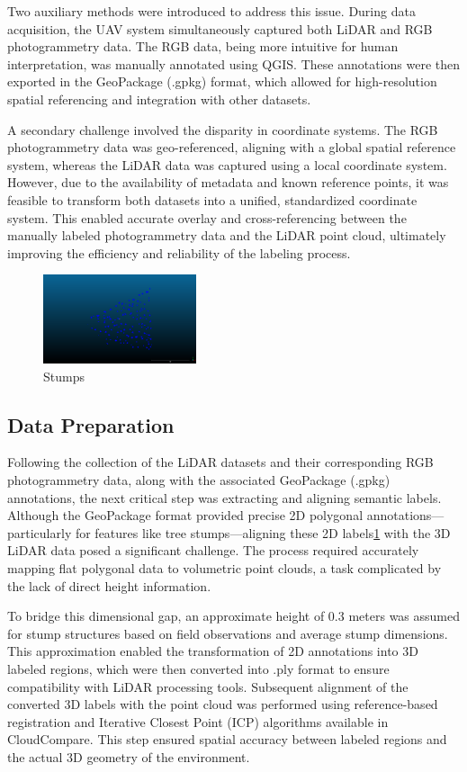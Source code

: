 \documentclass[../report.tex]{subfiles}
\begin{document}
    Two auxiliary methods were introduced to address this issue. During data acquisition, the UAV system simultaneously captured both LiDAR and RGB photogrammetry data. The RGB data, being more intuitive for human interpretation, was manually annotated using QGIS. These annotations were then exported in the GeoPackage\cite{gdal2025gpkg} (.gpkg) format, which allowed for high-resolution spatial referencing and integration with other datasets.
    
    A secondary challenge involved the disparity in coordinate systems. The RGB photogrammetry data was geo-referenced, aligning with a global spatial reference system, whereas the LiDAR data was captured using a local coordinate system. However, due to the availability of metadata and known reference points, it was feasible to transform both datasets into a unified, standardized coordinate system. This enabled accurate overlay and cross-referencing between the manually labeled photogrammetry data and the LiDAR point cloud, ultimately improving the efficiency and reliability of the labeling process.
    \begin{figure}[H]
        \centering
        \includegraphics[width=0.4\textwidth]{rnd-project-report-main/figures/Stumps_matched.png}
        \caption{Stumps}
        \label{fig:stumps}
    \end{figure}
    
    
	\subsection{Data Preparation}
    Following the collection of the LiDAR datasets and their corresponding RGB photogrammetry data, along with the associated GeoPackage (.gpkg) annotations, the next critical step was extracting and aligning semantic labels. Although the GeoPackage format provided precise 2D polygonal annotations—particularly for features like tree stumps—aligning these 2D labels\ref{fig:stumps} with the 3D LiDAR data posed a significant challenge. The process required accurately mapping flat polygonal data to volumetric point clouds, a task complicated by the lack of direct height information.

    To bridge this dimensional gap, an approximate height of 0.3 meters was assumed for stump structures based on field observations and average stump dimensions. This approximation enabled the transformation of 2D annotations into 3D labeled regions, which were then converted into .ply format to ensure compatibility with LiDAR processing tools. Subsequent alignment of the converted 3D labels with the point cloud was performed using reference-based registration and Iterative Closest Point (ICP) algorithms available in CloudCompare. This step ensured spatial accuracy between labeled regions and the actual 3D geometry of the environment.
    
\end{document}
